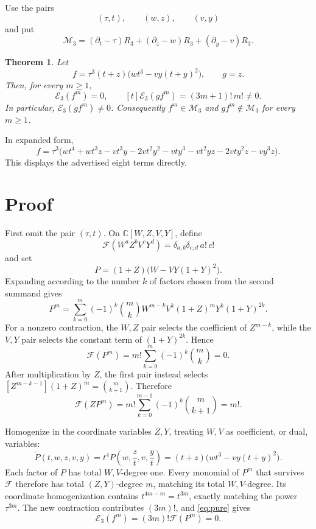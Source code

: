 \documentclass[11pt]{article}
\newtheorem{theorem}{Theorem}
\newcommand{\C}{\mathbb C}
\newcommand{\Eop}{\mathcal E}
\newcommand{\M}{\mathcal M}
\begin{document}
Use the pairs
\[
 (\tau,t),\qquad(w,z),\qquad(v,y)
\]
and put
\[
 \M_3=(\partial_t-\tau)R_3+
       (\partial_z-w)R_3+
       (\partial_y-v)R_3.
\]

\begin{theorem}\label{thm:main}
Let
\[
 \boxed{\quad
 f=\tau^3(t+z)\bigl(wt^3-vy(t+y)^2\bigr),\qquad g=z.
 \quad}
\]
Then, for every \(m\geq1\),
\[
 \Eop_3(f^m)=0,\qquad
 [t]\Eop_3(gf^m)=(3m+1)!\,m!\neq0.
\]
In particular, \(\Eop_3(gf^m)\neq0\).  Consequently
\(f^m\in\M_3\) and \(gf^m\notin\M_3\) for every \(m\geq1\).
\end{theorem}

In expanded form,
\[
\boxed{\;
 f=\tau^3\bigl(
 wt^4+wt^3z-vt^3y-2vt^2y^2-vty^3
 -vt^2yz-2vty^2z-vy^3z
 \bigr).
\;}
\]
This displays the advertised eight terms directly.

\section{Proof}

First omit the pair \((\tau,t)\).  On
\(\C[W,Z,V,Y]\), define
\[
 \mathcal F(W^aZ^bV^cY^d)
 =\delta_{a,b}\delta_{c,d}\,a!\,c!
\]
and set
\[
 P=(1+Z)\bigl(W-VY(1+Y)^2\bigr).
\]
Expanding according to the number \(k\) of factors chosen from the
second summand gives
\[
 P^m=\sum_{k=0}^m(-1)^k\binom mk
 W^{m-k}V^k(1+Z)^mY^k(1+Y)^{2k}.
\]
For a nonzero contraction, the \(W,Z\) pair selects the coefficient
of \(Z^{m-k}\), while the \(V,Y\) pair selects the constant term of
\((1+Y)^{2k}\).  Hence
\begin{equation}\label{eq:pure}
 \mathcal F(P^m)
 =m!\sum_{k=0}^m(-1)^k\binom mk=0.
\end{equation}
After multiplication by \(Z\), the first pair instead selects
\([Z^{m-k-1}](1+Z)^m=\binom m{k+1}\).  Therefore
\begin{equation}\label{eq:mixed}
 \mathcal F(ZP^m)
 =m!\sum_{k=0}^{m-1}(-1)^k\binom m{k+1}=m!.
\end{equation}

Homogenize in the coordinate variables \(Z,Y\), treating \(W,V\) as
coefficient, or dual, variables:
\[
 \widetilde P(t,w,z,v,y)
 =t^4P\left(w,\frac zt,v,\frac yt\right)
 =(t+z)\bigl(wt^3-vy(t+y)^2\bigr).
\]
Each factor of \(P\) has total \(W,V\)-degree one.  Every monomial of
\(P^m\) that survives \(\mathcal F\) therefore has total
\((Z,Y)\)-degree \(m\), matching its total \(W,V\)-degree.  Its
coordinate homogenization contains
\(t^{4m-m}=t^{3m}\), exactly matching the power \(\tau^{3m}\).
The new contraction contributes \((3m)!\), and
\eqref{eq:pure} gives
\[
 \Eop_3(f^m)=(3m)!\mathcal F(P^m)=0.
\]
\end{document}
